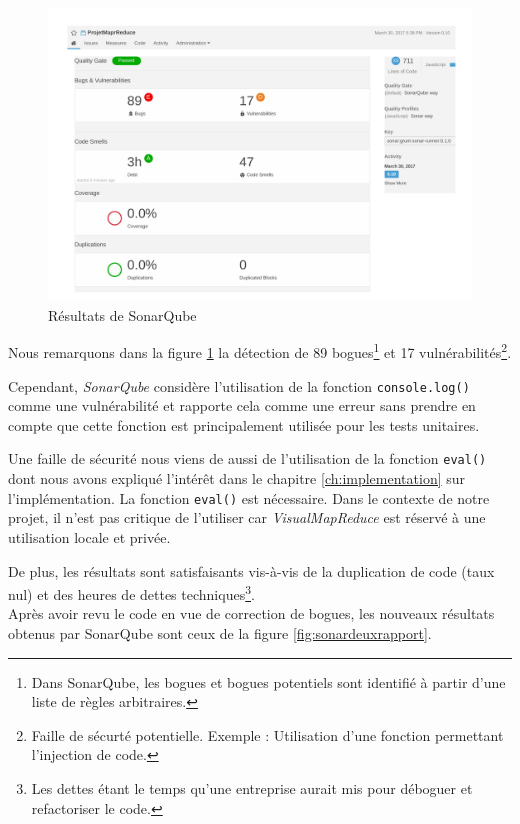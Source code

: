 \begin{figure}[H]
  \centering
    \includegraphics[width=1\textwidth]{images/sonarqube.pdf}
        \caption{Résultats de SonarQube}
	\label{fig:sonarpremierrapport}

\end{figure}

Nous remarquons dans la figure \ref{fig:sonarpremierrapport} la détection de 89 bogues\footnote{Dans SonarQube, les bogues et bogues potentiels sont identifié à partir d'une liste de règles arbitraires.} et 17 vulnérabilités\footnote{Faille de sécurté potentielle. Exemple : Utilisation d'une fonction permettant l'injection de code.}. 

Cependant, {\it SonarQube} considère l'utilisation de la fonction {\tt console.log()} comme une vulnérabilité et rapporte cela comme une erreur sans prendre en compte que cette fonction est principalement utilisée pour les tests unitaires.

Une faille de sécurité nous viens de aussi de l'utilisation de la fonction {\tt eval()} dont nous avons expliqué l'intérêt dans le chapitre \ref{ch:implementation} sur l'implémentation. La fonction {\tt eval()} est nécessaire. Dans le contexte de notre projet, il n'est pas critique de l'utiliser car {\it VisualMapReduce} est réservé à une utilisation locale et privée.

De plus, les résultats sont satisfaisants vis-à-vis de la duplication de code (taux nul) et des heures de dettes techniques\footnote{Les dettes étant le temps qu'une entreprise aurait mis pour déboguer et refactoriser le code.}.
\\
Après avoir revu le code en vue de correction de bogues, les nouveaux résultats obtenus par SonarQube sont ceux de la figure \ref{fig:sonardeuxrapport}.

